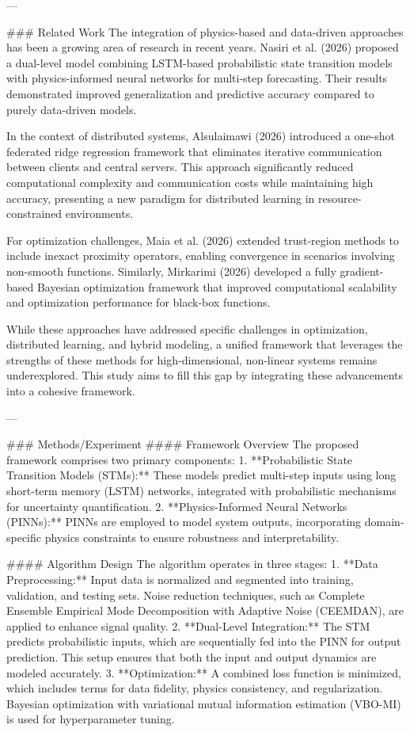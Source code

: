 ---

### Related Work
The integration of physics-based and data-driven approaches has been a growing area of research in recent years. Nasiri et al. (2026) proposed a dual-level model combining LSTM-based probabilistic state transition models with physics-informed neural networks for multi-step forecasting. Their results demonstrated improved generalization and predictive accuracy compared to purely data-driven models.

In the context of distributed systems, Alsulaimawi (2026) introduced a one-shot federated ridge regression framework that eliminates iterative communication between clients and central servers. This approach significantly reduced computational complexity and communication costs while maintaining high accuracy, presenting a new paradigm for distributed learning in resource-constrained environments.

For optimization challenges, Maia et al. (2026) extended trust-region methods to include inexact proximity operators, enabling convergence in scenarios involving non-smooth functions. Similarly, Mirkarimi (2026) developed a fully gradient-based Bayesian optimization framework that improved computational scalability and optimization performance for black-box functions.

While these approaches have addressed specific challenges in optimization, distributed learning, and hybrid modeling, a unified framework that leverages the strengths of these methods for high-dimensional, non-linear systems remains underexplored. This study aims to fill this gap by integrating these advancements into a cohesive framework.

---

### Methods/Experiment
#### Framework Overview
The proposed framework comprises two primary components:
1. **Probabilistic State Transition Models (STMs):** These models predict multi-step inputs using long short-term memory (LSTM) networks, integrated with probabilistic mechanisms for uncertainty quantification.
2. **Physics-Informed Neural Networks (PINNs):** PINNs are employed to model system outputs, incorporating domain-specific physics constraints to ensure robustness and interpretability.

#### Algorithm Design
The algorithm operates in three stages:
1. **Data Preprocessing:** Input data is normalized and segmented into training, validation, and testing sets. Noise reduction techniques, such as Complete Ensemble Empirical Mode Decomposition with Adaptive Noise (CEEMDAN), are applied to enhance signal quality.
2. **Dual-Level Integration:** The STM predicts probabilistic inputs, which are sequentially fed into the PINN for output prediction. This setup ensures that both the input and output dynamics are modeled accurately.
3. **Optimization:** A combined loss function is minimized, which includes terms for data fidelity, physics consistency, and regularization. Bayesian optimization with variational mutual information estimation (VBO-MI) is used for hyperparameter tuning.

